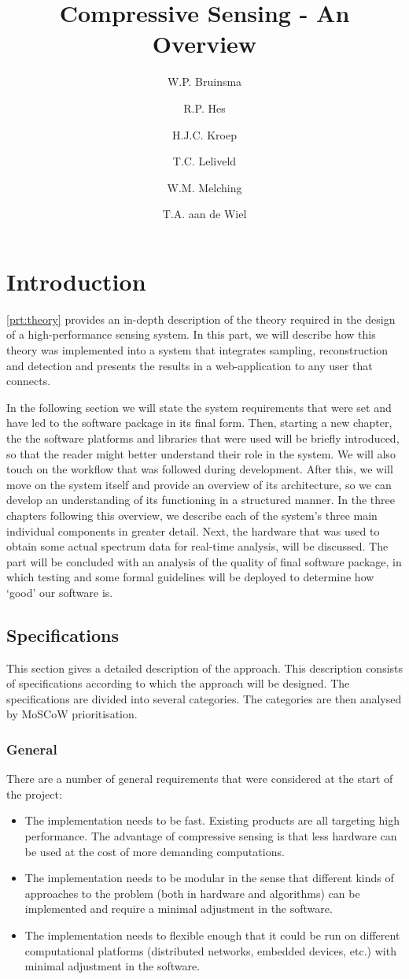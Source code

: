 \documentclass[a4paper, openany, oneside]{memoir}
\title{Compressive Sensing - An Overview}
\author{W.P. Bruinsma \and R.P. Hes \and H.J.C. Kroep \and T.C. Leliveld \and W.M. Melching \and T.A. aan de Wiel}
\begin{document}
\chapter{Introduction}
\cref{prt:theory} provides an in-depth description of the theory required in the design of a high-performance sensing system.
In this part, we will describe how this theory was implemented into a system that integrates sampling, reconstruction and detection and presents the results in a web-application to any user that connects.

In the following section we will state the system requirements that were set and have led to the software package in its final form. Then, starting a new chapter, the the software platforms and libraries that were used will be briefly introduced, so that the reader might better understand their role in the system. We will also touch on the workflow that was followed during development. After this, we will move on the system itself and provide an overview of its architecture, so we can develop an understanding of its functioning in a structured manner. In the three chapters following this overview, we describe each of the system's three main individual components in greater detail. Next, the hardware that was used to obtain some actual spectrum data for real-time analysis, will be discussed. The part will be concluded with an analysis of the quality of final software package, in which testing and some formal guidelines will be deployed to determine how `good' our software is.

\section{Specifications}
\label{sec:implementation-specs}
This section gives a detailed description of the approach. This description consists of specifications according to which the approach will be designed. The specifications are divided into several categories. The categories are then analysed by MoSCoW prioritisation.

\subsection{General}
There are a number of general requirements that were considered at the start of the project:
\begin{itemize}
    \item The implementation needs to be fast. Existing products are all targeting high performance. The advantage of compressive sensing is that less hardware can be used at the cost of more demanding computations.
    \item The implementation needs to be modular in the sense that different kinds of approaches to the problem (both in hardware and algorithms) can be implemented and require a minimal adjustment in the software.
    \item The implementation needs to flexible enough that it could be run on different computational platforms (distributed networks, embedded devices, etc.) with minimal adjustment in the software.
\end{itemize}
\end{document}
